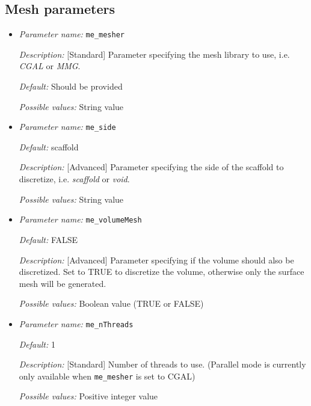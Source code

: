 \subsection{Mesh parameters} \label{parameters:mesh}
\begin{itemize}
	\item {\it Parameter name:} {\tt me\_mesher}
	\label{parameters:me_mesher}
	
	
	{\it Description:} [Standard] Parameter specifying the mesh library to use, i.e. {\it CGAL} or {\it MMG}.
	
	{\it Default:} Should be provided
	
	{\it Possible values:} String value
	
	\item {\it Parameter name:} {\tt me\_side}
	\label{parameters:me_side}
	
	
	{\it Default:} scaffold
	
	{\it Description:} [Advanced] Parameter specifying the side of the scaffold to discretize, i.e. {\it scaffold} or {\it void}.
	
	{\it Possible values:} String value
	
	\item {\it Parameter name:} {\tt me\_volumeMesh}
	\label{parameters:me_volumeMesh}
	
	
	{\it Default:} FALSE
	
	{\it Description:} [Advanced] Parameter specifying if the volume should also be discretized. Set to TRUE to discretize the volume, otherwise only the surface mesh will be generated.
	
	{\it Possible values:} Boolean value (TRUE or FALSE) 
	
	\item {\it Parameter name:} {\tt me\_nThreads}
	\label{parameters:me_nThreads}
	
	
	{\it Default:} 1
	
	{\it Description:} [Standard] Number of threads to use. (Parallel mode is currently only available when {\tt me\_mesher} is set to CGAL)
	
	{\it Possible values:} Positive integer value
\end{itemize}

